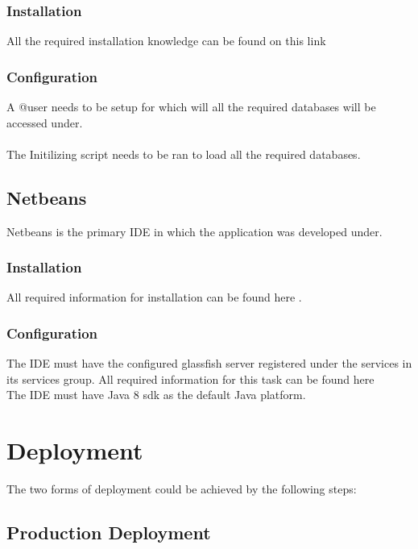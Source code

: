 \documentclass[12pt]{article}
\begin{document}
\subsubsection{Installation}
All the required installation knowledge can be found on this link \textbf{} 

\subsubsection{Configuration}
A @user needs to be setup for which will all the required databases will be accessed under. 
\\
\\
The Initilizing script needs to be ran to load all the required databases.

\subsection{Netbeans} 
Netbeans is the primary IDE in which the application was developed under.

\subsubsection{Installation}
All required information for installation can be found here \textbf{}.

\subsubsection{Configuration}
The IDE must have the configured glassfish server registered under the services in its services group. All required information for this task can be found here \textbf{}
\\
The IDE must have Java 8 sdk as the default Java platform.

\section{Deployment}
The two forms of deployment could be achieved by the following steps: 
\subsection{Production Deployment}
\end{document}
